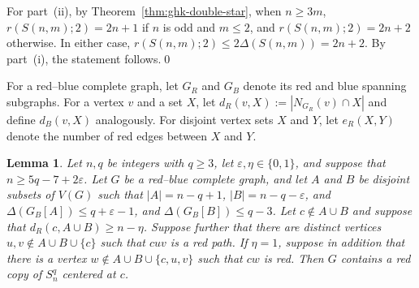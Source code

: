 \documentclass[11pt]{article}
\newtheorem{lemma}[theorem]{Lemma}
\theoremstyle{definition}
\theoremstyle{remark}
\begin{document}
For part~\textup{(ii)}, by Theorem~\ref{thm:ghk-double-star}, when \(n\ge3m\),
\(r(S(n,m);2)=2n+1\) if \(n\) is odd and \(m\le2\), and
\(r(S(n,m);2)=2n+2\) otherwise. In either case,
\(r(S(n,m);2)\le2\Delta(S(n,m))=2n+2\). By part~\textup{(i)}, the statement follows.\qed

For a red--blue complete graph, let \(G_R\) and
\(G_B\) denote its red and blue spanning subgraphs. For a vertex \(v\)
and a set \(X\), let
\(d_R(v,X):=|N_{G_R}(v)\cap X|\) and define \(d_B(v,X)\)
analogously. For disjoint vertex sets \(X\) and \(Y\), let
\(e_R(X,Y)\) denote the number of red edges between \(X\) and \(Y\).

\begin{lemma}\label{lem:extension}
Let \(n,q\) be integers with \(q\geq3\), let
\(\varepsilon,\eta\in\{0,1\}\), and suppose that
\(n\geq5q-7+2\varepsilon\).
Let \(G\) be a red--blue complete graph, and let \(A\) and \(B\) be
disjoint subsets of \(V(G)\) such that
\(|A|=n-q+1\), \(|B|=n-q-\varepsilon\),
and
\(\Delta(G_B[A])\leq q+\varepsilon-1\), and \(\Delta(G_B[B])\leq q-3\).
Let \(c\notin A\cup B\) and suppose that
\(d_R(c,A\cup B)\geq n-\eta\).
Suppose further that there are distinct vertices
\(u,v\notin A\cup B\cup\{c\}\) such that \(cuv\) is a red path. If
\(\eta=1\), suppose in addition that there is a vertex
\(w\notin A\cup B\cup\{c,u,v\}\) such that \(cw\) is red. Then
\(G\) contains a red copy of \(S_n^q\) centered at \(c\).
\end{lemma}
\end{document}
